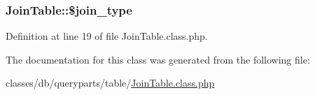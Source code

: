 \hypertarget{classJoinTable_a00c6a8c44beb3b85c9f3a3e5be03fba8}{
\subsubsection[{\$join\-\_\-type}]{\setlength{\rightskip}{0pt plus 5cm}Join\-Table\-::\$join\-\_\-type}}\label{classJoinTable_a00c6a8c44beb3b85c9f3a3e5be03fba8}


Definition at line 19 of file Join\-Table.\-class.\-php.



The documentation for this class was generated from the following file\-:\begin{DoxyCompactItemize}
\item 
classes/db/queryparts/table/\hyperlink{JoinTable_8class_8php}{Join\-Table.\-class.\-php}\end{DoxyCompactItemize}
